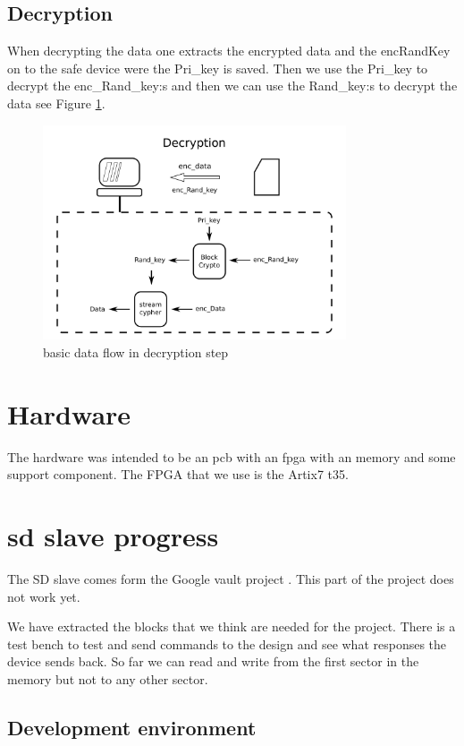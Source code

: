 \documentclass[]{article}
\begin{document}
\subsection{Decryption}
When decrypting the data one extracts the encrypted data and the \acrfull{encRandKey} on to the safe device were the Pri\_key is saved.
Then we use the Pri\_key to decrypt the enc\_Rand\_key:s and then we can use the Rand\_key:s to decrypt the data see Figure \ref{fig:decrypt}.

\begin{figure}[h]
	\centering
	\includegraphics[width=0.8\textwidth]{ilustrations/decryption.pdf}
	\caption{basic data flow in decryption step}
	\label{fig:decrypt}
\end{figure}

\section{Hardware}
The hardware was intended to be an \acrfull{pcb} with an \acrfull{fpga} with an memory and some support component.
The FPGA that we use is the Artix7 t35.


\section{sd slave progress}
The SD slave comes form the Google vault project \cite{GV}.
This part of the project does not work yet.

We have extracted the blocks that we think are needed for the project.
There is a test bench to test and send commands to the design and see what responses the device sends back.
So far we can read and write from the first sector in the memory but not to any other sector.

\subsection{Development environment}
\end{document}
